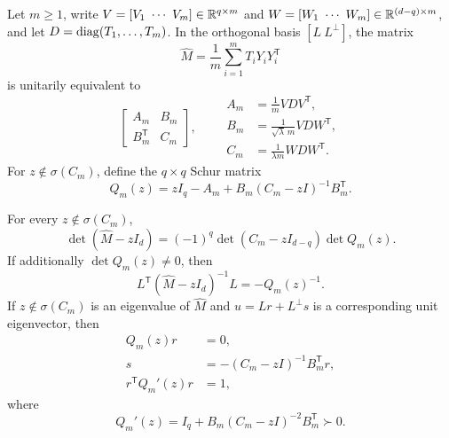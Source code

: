 Let $m\ge1$, write $V=[V_1\ \cdots\ V_m]\in\mathbb{R}^{q\times m}$ and
$W=[W_1\ \cdots\ W_m]\in\R^{(d-q)\times m}$, and let
$D=\operatorname{diag}(T_1,\ldots,T_m)$. In the orthogonal basis $[L\ L^\perp]$, the matrix
\begin{equation}
\widehat M=\frac1m\sum_{i=1}^m T_iY_iY_i^{\mathsf T}
\end{equation}
is unitarily equivalent to
\begin{equation}
\begin{bmatrix}
A_m&B_m\\
B_m^{\mathsf T}&C_m
\end{bmatrix},
\qquad
\begin{aligned}
A_m&=\frac1mVDV^{\mathsf T},\\
B_m&=\frac1{\sqrt{\lambda}\,m}VDW^{\mathsf T},\\
C_m&=\frac1{\lambda m}WDW^{\mathsf T}.
\end{aligned}
\label{S:block-matrix}
\end{equation}
For $z\notin\sigma(C_m)$, define the $q\times q$ Schur matrix
\begin{equation}
Q_m(z)
=
zI_q-A_m+B_m(C_m-zI)^{-1}B_m^{\mathsf T}.
\label{S:exact-Q}
\end{equation}

\begin{lemma}
\label{S:exact-schur-lemma}
For every $z\notin\sigma(C_m)$,
\begin{equation}
\det(\widehat M-zI_d)
=
(-1)^q\det(C_m-zI_{d-q})\det Q_m(z).
\label{S:exact-det}
\end{equation}
If additionally $\det Q_m(z)\ne0$, then
\begin{equation}
L^{\mathsf T}(\widehat M-zI_d)^{-1}L=-Q_m(z)^{-1}.
\label{S:exact-compressed-resolvent}
\end{equation}
If $z\notin\sigma(C_m)$ is an eigenvalue of $\widehat M$ and
$u=Lr+L^\perp s$ is a corresponding unit eigenvector, then
\begin{align}
Q_m(z)r&=0,\label{S:exact-evec-Q}\\
s&=-(C_m-zI)^{-1}B_m^{\mathsf T}r,\label{S:exact-evec-s}\\
r^{\mathsf T}Q_m'(z)r&=1,\label{S:exact-evec-norm}
\end{align}
where
\begin{equation}
Q_m'(z)=I_q+B_m(C_m-zI)^{-2}B_m^{\mathsf T}\succ0.
\label{S:exact-Q-prime}
\end{equation}
\end{lemma}

